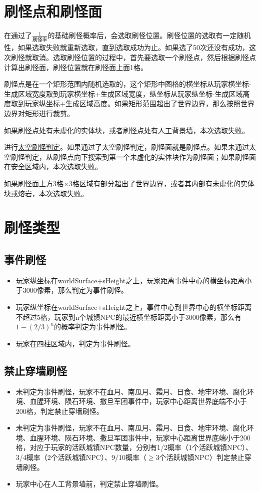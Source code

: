 \section{刷怪点和刷怪面}
在通过了$\frac{1}{\textrm{刷怪率}}$的基础刷怪概率后，会选取刷怪位置。刷怪位置的选取有一定随机性，如果选取失败就重新选取，直到选取成功为止。如果选了50次还没有成功，这次刷怪就取消。选取刷怪位置的过程中，首先要选取一个刷怪点，然后根据刷怪点计算出刷怪面，刷怪位置就在刷怪面上面1格。

刷怪点是在一个矩形范围内随机选取的，这个矩形中图格的横坐标从玩家横坐标-生成区域宽度取到玩家横坐标+生成区域宽度，纵坐标从玩家纵坐标-生成区域高度取到玩家纵坐标+生成区域高度。如果矩形范围超出了世界边界，那么按照世界边界对矩形进行裁剪。

如果刷怪点处有未虚化的实体块，或者刷怪点处有人工背景墙，本次选取失败。

进行\hyperref[app22]{太空刷怪判定}。如果通过了太空刷怪判定，刷怪面就是刷怪点。如果未通过太空刷怪判定，从刷怪点向下搜索到第一个未虚化的实体块作为刷怪面；如果刷怪面在安全区域内，本次选取失败。

如果刷怪面上方3格$\times$3格区域有部分超出了世界边界，或者其内部有未虚化的实体块或熔岩，本次选取失败。

\section{刷怪类型}

\subsection{事件刷怪}
\begin{itemize}
    \item 玩家纵坐标在worldSurface+sHeight之上，玩家距离事件中心的横坐标距离小于3000像素，那么判定为事件刷怪。
    \item 玩家纵坐标在worldSurface+sHeight之上，事件中心到世界中心的横坐标距离不超过5格，玩家到n个城镇NPC的最近横坐标距离小于3000像素，那么有$1-(2/3)^n$的概率判定为事件刷怪。
    \item 玩家在四柱区域内，判定为事件刷怪。
\end{itemize}

\subsection{禁止穿墙刷怪}
\begin{itemize}
    \item 未判定为事件刷怪，玩家不在血月、南瓜月、霜月、日食、地牢环境、腐化环境、血腥环境、陨石环境、撒旦军团事件中，玩家中心距离世界底端不小于200格，判定禁止穿墙刷怪。
    \item 未判定为事件刷怪，玩家不在血月、南瓜月、霜月、日食、地牢环境、腐化环境、血腥环境、陨石环境、撒旦军团事件中，玩家中心距离世界底端小于200格，对应于玩家的活跃城镇NPC数量，分别有1/2概率（1个活跃城镇NPC）、3/4概率（2个活跃城镇NPC）、9/10概率（$\ge$3个活跃城镇NPC）判定禁止穿墙刷怪。
    \item 玩家中心在人工背景墙前，判定禁止穿墙刷怪。
\end{itemize}

